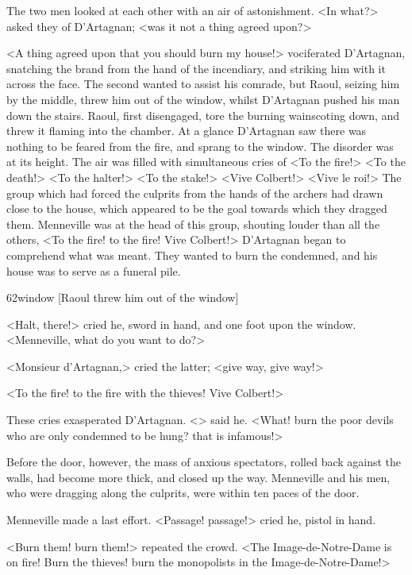 The two men looked at each other with an air of astonishment. <In what?> asked they of D'Artagnan; <was it not a thing agreed upon?>

<A thing agreed upon that you should burn my house!> vociferated D'Artagnan, snatching the brand from the hand of the incendiary, and striking him with it across the face. The second wanted to assist his comrade, but Raoul, seizing him by the middle, threw him out of the window, whilst D'Artagnan pushed his man down the stairs. Raoul, first disengaged, tore the burning wainscoting down, and threw it flaming into the chamber. At a glance D'Artagnan saw there was nothing to be feared from the fire, and sprang to the window. The disorder was at its height. The air was filled with simultaneous cries of <To the fire!> <To the death!> <To the halter!> <To the stake!> <Vive Colbert!> <Vive le roi!> The group which had forced the culprits from the hands of the archers had drawn close to the house, which appeared to be the goal towards which they dragged them. Menneville was at the head of this group, shouting louder than all the others, <To the fire! to the fire! Vive Colbert!> D'Artagnan began to comprehend what was meant. They wanted to burn the condemned, and his house was to serve as a funeral pile.

\begin{bwbigpic}
	[\basicscale] 
	{62window}
	[Raoul threw him out of the window]
\end{bwbigpic}

<Halt, there!> cried he, sword in hand, and one foot upon the window. <Menneville, what do you want to do?>

<Monsieur d'Artagnan,> cried the latter; <give way, give way!>

<To the fire! to the fire with the thieves! Vive Colbert!>

These cries exasperated D'Artagnan. <> said he. <What! burn the poor devils who are only condemned to be hung? that is infamous!>

Before the door, however, the mass of anxious spectators, rolled back against the walls, had become more thick, and closed up the way. Menneville and his men, who were dragging along the culprits, were within ten paces of the door.

Menneville made a last effort. <Passage! passage!> cried he, pistol in hand.

<Burn them! burn them!> repeated the crowd. <The Image-de-Notre-Dame is on fire! Burn the thieves! burn the monopolists in the Image-de-Notre-Dame!>

